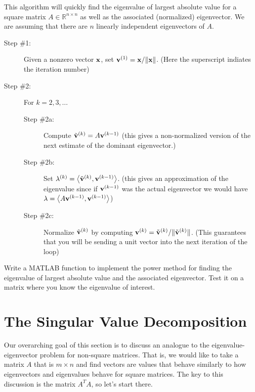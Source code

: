     \begin{technique} This algorithm will quickly find the 
        eigenvalue of largest absolute value for a square matrix $A \in \mathbb{R}^{n \times
        n}$ as well as the associated (normalized) eigenvector.  We are
        assuming that there are $n$ linearly independent eigenvectors of $A$.
        \begin{description}
            \item[Step \#1:] Given a nonzero vector ${\bf x}$, set ${\bf v}^{(1)} = {\bf x} / \|{\bf x}\|$.
                (Here the superscript indiates the iteration number)
            \item[Step \#2:] For $k=2, 3, \ldots$
                \begin{description}
                    \item[Step \#2a:] Compute $\tilde{{\bf v}}^{(k)} = A {\bf v}^{(k-1)}$ (this gives
                        a non-normalized version of the next estimate of the dominant
                        eigenvector.)
                    \item[Step \#2b:] Set $\lambda^{(k)} = \left< \tilde{{\bf v}}^{(k)} ,
                        {\bf v}^{(k-1)} \right>$.  (this gives an approximation of the eigenvalue
                        since if ${\bf v}^{(k-1)}$ was the actual eigenvector we would have
                        $\lambda = \left< A {\bf v}^{(k-1)}, {\bf v}^{(k-1)} \right>$)
                    \item[Step \#2c:] Normalize $\tilde{{\bf v}}^{(k)}$ by computing ${\bf v}^{(k)} =
                        \tilde{{\bf v}}^{(k)} / \| \tilde{{\bf v}}^{(k)} \|$. (This guarantees that
                        you will be sending a unit vector into the next iteration of the loop)
                \end{description}
        \end{description}
\end{technique}

\begin{problem}
    Write a MATLAB function to implement the power method for finding the eigenvalue of
    largest absolute value and the associated eigenvector.  Test it on a matrix where you
    know the eigenvalue of interest.
\end{problem}


\newpage\section{The Singular Value Decomposition}
Our overarching goal of this section is to discuss an analogue to the
eigenvalue-eigenvector problem for non-square matrices.  That is, we would like to take a
matrix $A$ that is $m \times n$ and find vectors are values that behave similarly to how
eigenvectors and eigenvalues behave for square matrices.  The key to this discussion is
the matrix $A^T A$, so let's start there.

